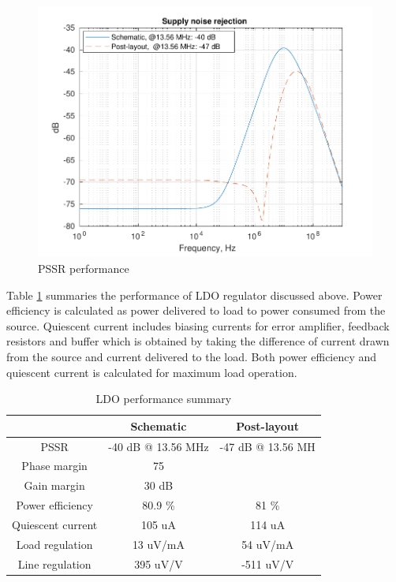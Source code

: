 \documentclass[12pt,a4paper,UKenglish]{article}
\begin{document}
\begin{figure}[H] %
   \centering
   \includegraphics[width=\textwidth]{img/ldo_pssr_both.pdf} 
   \caption{PSSR performance}
   \label{fig:ldo_pssr}
\end{figure}

Table \ref{ldo_spec} summaries the performance of LDO regulator discussed above. Power efficiency is calculated as power delivered to load to power consumed 
from the source. Quiescent current includes biasing currents for error amplifier, feedback resistors and buffer which is obtained by taking the difference of current 
drawn from the source and current delivered to the load. Both power efficiency and quiescent current is calculated for maximum load operation. 

\begin{table}[H]
\caption{LDO performance summary} 
\begin{center}
\begin{tabular}{c|c|c}
\hline \hline
			& \textbf{Schematic}	& \textbf{Post-layout} 	\\
\hline \hline
PSSR 			& -40 dB @ 13.56 MHz	&-47 dB	@ 13.56 MH 	\\ \hline
Phase margin		& 75\textdegree 	&	 		\\ \hline
Gain margin		& 30 dB			&	 		\\ \hline
Power efficiency	& 80.9 \%		& 81 \%			\\ \hline
Quiescent current	& 105 uA		& 114 uA		\\ \hline
Load regulation 	& 13 uV/mA		& 54 uV/mA		\\ \hline
Line regulation 	&  395 uV/V 		& -511 uV/V		\\ 
\hline \hline
\end{tabular}
\end{center}
\label{ldo_spec}
\end{table}%
\end{document}
